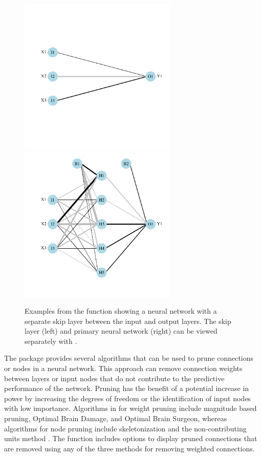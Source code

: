 \documentclass[article,shortnames]{jss}\usepackage[]{graphicx}\usepackage[]{color}
\newenvironment{knitrout}{}{} %
\begin{document}
\begin{knitrout}
\begin{figure}[!ht]
{\centering \includegraphics[width=7.5cm,height=7.5cm]{figs/plotnet_skip-1} 
\includegraphics[width=7.5cm,height=7.5cm]{figs/plotnet_skip-2} 

}

\caption{Examples from the  function showing a neural network with a separate skip layer between the input and output layers.  The skip layer (left) and primary neural network (right) can be viewed separately with .}\label{fig:plotnet_skip}
\end{figure}


\end{knitrout}

The  package provides several algorithms that can be used to prune connections or nodes in a neural network.  This approach can remove connection weights between layers or input nodes that do not contribute to the predictive performance of the network.  Pruning has the benefit of a potential increase in power by increasing the degrees of freedom or the identification of input nodes with low importance.  Algorithms in  for weight pruning include magnitude based pruning, Optimal Brain Damage, and Optimal Brain Surgeon, whereas algorithms for node pruning include skeletonization and the non-contributing units method \citep{Zell98}.  The  function includes options to display pruned connections that are removed using any of the three methods for removing weighted connections.  
\end{document}
